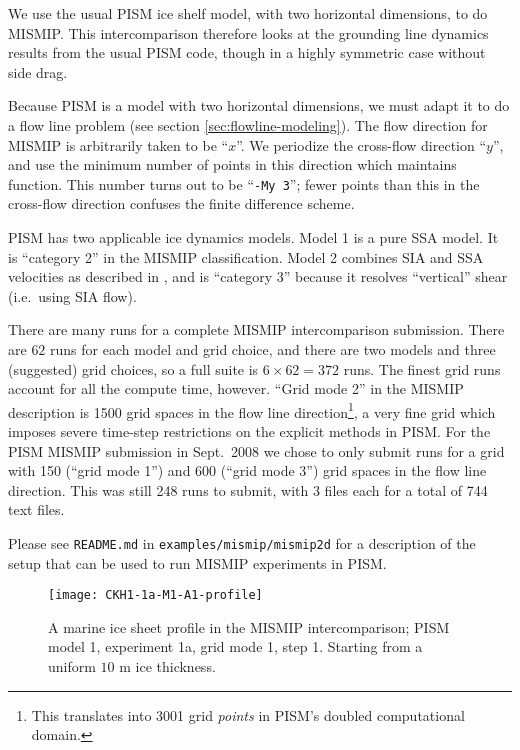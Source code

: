 We use the usual PISM ice shelf model, with two horizontal dimensions, to do MISMIP.  This intercomparison therefore looks at the grounding line dynamics results from the usual PISM code, though in a highly symmetric case without side drag.

Because PISM is a model with two horizontal dimensions, we must adapt it to do a flow line problem (see section \ref{sec:flowline-modeling}). The flow direction for MISMIP is arbitrarily taken to be ``$x$''.  We periodize the cross-flow direction ``$y$'', and use the minimum number of points in this direction which maintains function.  This number turns out to be ``\texttt{-My 3}''; fewer points than this in the cross-flow direction confuses the finite difference scheme.

PISM has two applicable ice dynamics models. Model 1 is a pure SSA model.  It is ``category 2'' in the MISMIP classification.  Model 2 combines SIA and SSA velocities as described in \cite{BBssasliding}, and is ``category 3'' because it resolves ``vertical'' shear (i.e.~using SIA flow).

There are many runs for a complete MISMIP intercomparison submission.  There are $62$ runs for each model and grid choice, and there are two models and three (suggested) grid choices, so a full suite is $6 \times 62 = 372$ runs.  The finest grid runs account for all the compute time, however.  ``Grid mode 2'' in the MISMIP description is 1500 grid spaces in the flow line direction\footnote{This translates into 3001 grid \emph{points} in PISM's doubled computational domain.}, a very fine grid which imposes severe time-step restrictions on the explicit methods in PISM.  For the PISM MISMIP submission in Sept.~2008 we chose to only submit runs for a grid with 150 (``grid mode 1'') and 600 (``grid mode 3'') grid spaces in the flow line direction.  This was still 248 runs to submit, with 3 files each for a total of 744 text files.

Please see \texttt{README.md} in \texttt{examples/mismip/mismip2d} for a description of the setup that can be used to run MISMIP experiments in PISM.

\begin{figure}[ht]
\centering
\texttt{[image: CKH1-1a-M1-A1-profile]}
\caption{A marine ice sheet profile in the MISMIP intercomparison; PISM model 1, experiment 1a, grid mode 1, step 1. Starting from a uniform $10$ m ice thickness.}
\label{fig:MISMIPmodel1exper1aM1A1}
\end{figure}

